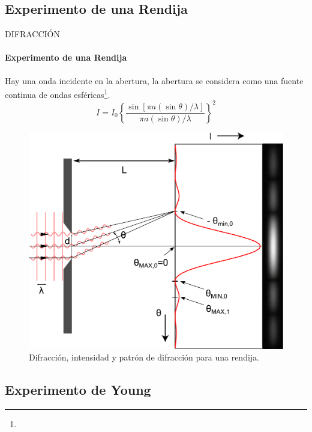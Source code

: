 \subsection{Experimento de una Rendija}
\begin{frame}{DIFRACCIÓN}
    \framesubtitle{Experimento de una Rendija}
    Hay una onda incidente en la abertura, la abertura se considera como una fuente continua de ondas esféricas\footnote{}.
    \begin{equation}
        I=I_0\left\{\frac{\sin\left[\pi a \left(\sin\theta\right)/\lambda\right]}{\pi a\left(\sin\theta\right)/\lambda}\right\}^2
    \end{equation}
    \vspace{-5mm}
    \begin{figure}
        \centering
        \includegraphics[scale=0.25]{david/singleSlit.pdf}
        \caption{Difracción, intensidad y patrón de difracción para una rendija.}
    \end{figure}
    \vspace{-2cm}
\end{frame}

\subsection{Experimento de Young}

